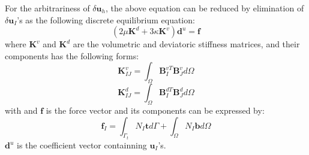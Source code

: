 For the arbitrariness of $\delta \boldsymbol u_h$, the above equation can be reduced by elimination of $\delta \boldsymbol u_I$'s as the following discrete equilibrium equation:
\begin{equation}\label{equilibrium_penalty}
(2\mu\boldsymbol K^d + 3\kappa\boldsymbol K^v) \boldsymbol d^u = \boldsymbol f
\end{equation}
where $\boldsymbol K^v$ and $\boldsymbol K^d$ are the volumetric and deviatoric stiffness matrices, and their components has the following forms:
\begin{equation}\label{stiffness_vol}
    \boldsymbol K^v_{IJ}= \int_{\Omega} \boldsymbol B^{vT}_I \boldsymbol B^v_J d\Omega
\end{equation}
\begin{equation}
    \boldsymbol K^d_{IJ}= \int_{\Omega} \boldsymbol B^{dT}_I \boldsymbol B^d_J d\Omega
\end{equation}
with
and $\boldsymbol f$ is the force vector and its components can be expressed by:
\begin{equation}
\boldsymbol f_I = \int_{\Gamma_t} N_I \boldsymbol t d\Gamma + \int_{\Omega} N_I \boldsymbol b d\Omega
\end{equation}
$\boldsymbol d^u$ is the coefficient vector containning $\boldsymbol u_I$'s.

